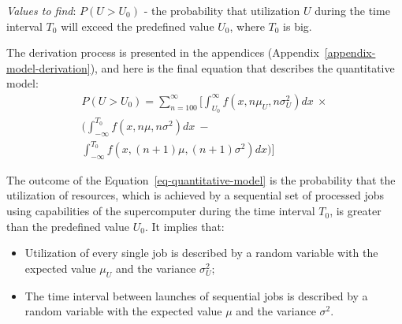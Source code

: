 \textit{Values to find}:
$P(U > U_0)$ - the probability that utilization $U$ during the time interval $T_0$ will exceed the predefined value $U_0$, where $T_0$ is big.

The derivation process is presented in the appendices (Appendix~\ref{appendix-model-derivation}), and here is the final equation that describes the quantitative model:
\begin{equation}
    \label{eq-quantitative-model}
    \begin{multlined}
    P(U > U_0) = \sum\limits_{n=100}^{\infty} 
                 \bigg[ \int_{U_0}^{\infty}f(x, n\mu_{U}, n\sigma_{U}^2)dx \  \times \\
                 \bigg( \int_{-\infty}^{T_0}f(x, n\mu, n\sigma^2)dx \  - \\
                 \int_{-\infty}^{T_0}f(x, (n+1)\mu, (n+1)\sigma^2)dx \bigg) \bigg]
    \end{multlined}
\end{equation}

The outcome of the Equation~\ref{eq-quantitative-model} is the probability that the utilization of resources, which is achieved by a sequential set of processed jobs using capabilities of the supercomputer during the time interval $T_0$, is greater than the predefined value $U_0$. It implies that:
\begin{itemize}
	\item Utilization of every single job is described by a random variable with the expected value $\mu_{U}$ and the variance $\sigma_{U}^2$;
	\item The time interval between launches of sequential jobs is described by a random variable with the expected value $\mu$ and the variance $\sigma^2$.
\end{itemize}
